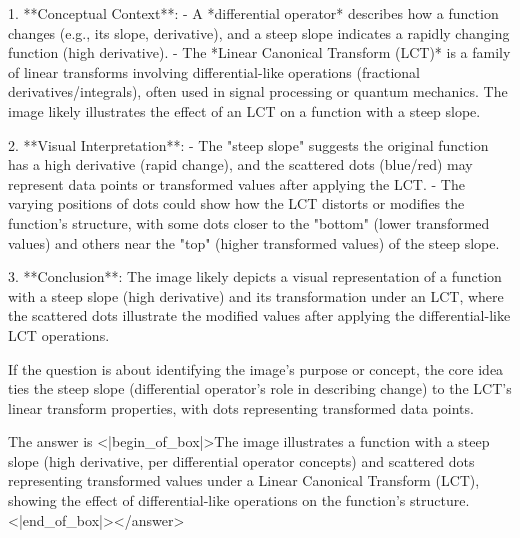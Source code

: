 1. **Conceptual Context**:  
   - A *differential operator* describes how a function changes (e.g., its slope, derivative), and a steep slope indicates a rapidly changing function (high derivative).  
   - The *Linear Canonical Transform (LCT)* is a family of linear transforms involving differential-like operations (fractional derivatives/integrals), often used in signal processing or quantum mechanics. The image likely illustrates the effect of an LCT on a function with a steep slope.  

2. **Visual Interpretation**:  
   - The "steep slope" suggests the original function has a high derivative (rapid change), and the scattered dots (blue/red) may represent data points or transformed values after applying the LCT.  
   - The varying positions of dots could show how the LCT distorts or modifies the function’s structure, with some dots closer to the "bottom" (lower transformed values) and others near the "top" (higher transformed values) of the steep slope.  

3. **Conclusion**:  
   The image likely depicts a visual representation of a function with a steep slope (high derivative) and its transformation under an LCT, where the scattered dots illustrate the modified values after applying the differential-like LCT operations.  

If the question is about identifying the image’s purpose or concept, the core idea ties the steep slope (differential operator’s role in describing change) to the LCT’s linear transform properties, with dots representing transformed data points.  

The answer is <|begin_of_box|>The image illustrates a function with a steep slope (high derivative, per differential operator concepts) and scattered dots representing transformed values under a Linear Canonical Transform (LCT), showing the effect of differential-like operations on the function’s structure.<|end_of_box|></answer>